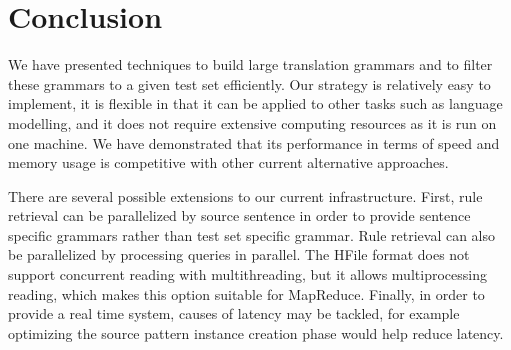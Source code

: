 \section{Conclusion}
\label{sec:conclusion}

We have presented techniques to build large translation
grammars and to filter these grammars to a given test set efficiently.
Our strategy is relatively easy to implement, it is
flexible in that it can be applied to other tasks such as language modelling,
and it does not require extensive computing resources as it is run on one
machine. We have demonstrated that its performance in terms of speed and memory
usage is competitive with other current alternative approaches.

There are several possible extensions to our current infrastructure.
First, rule retrieval can be parallelized by source sentence in order %
to provide sentence specific grammars rather than test set specific
grammar. Rule retrieval can also be parallelized by
processing queries in parallel. The HFile format does not support
concurrent reading with multithreading, but it allows multiprocessing
reading, which makes this option suitable for MapReduce.
Finally, in order to provide a real time system, causes of latency
may be tackled, for example optimizing the source pattern instance
creation phase would help reduce latency.
